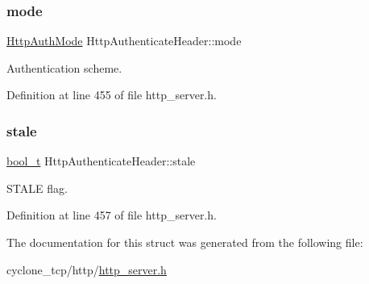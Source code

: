 \subsubsection{\texorpdfstring{mode}{mode}}
{\footnotesize\ttfamily \hyperlink{http__common_8h_ad435f9e57a3351beaec6fc809eff4f31}{Http\+Auth\+Mode} Http\+Authenticate\+Header\+::mode}



Authentication scheme. 



Definition at line 455 of file http\+\_\+server.\+h.

\mbox{\label{structHttpAuthenticateHeader_a684724ab0988a6e8588adb71b4c996b7}} 
\subsubsection{\texorpdfstring{stale}{stale}}
{\footnotesize\ttfamily \hyperlink{compiler__port_8h_a812d16e5494522586b3784e55d479912}{bool\+\_\+t} Http\+Authenticate\+Header\+::stale}



S\+T\+A\+LE flag. 



Definition at line 457 of file http\+\_\+server.\+h.



The documentation for this struct was generated from the following file\+:\begin{DoxyCompactItemize}
\item 
cyclone\+\_\+tcp/http/\hyperlink{http__server_8h}{http\+\_\+server.\+h}\end{DoxyCompactItemize}
